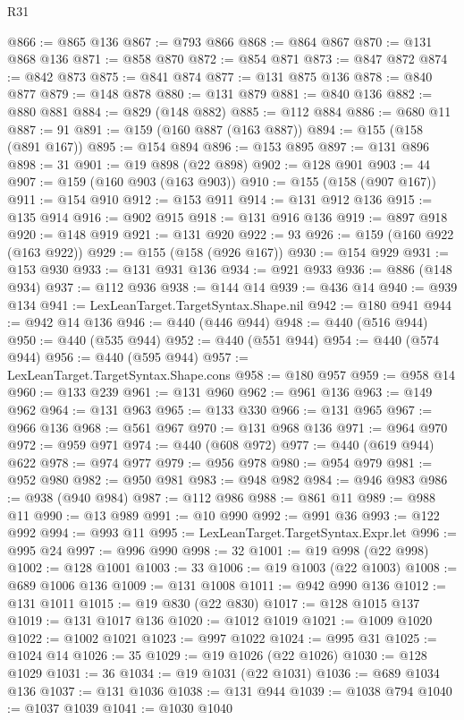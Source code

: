 \begin{lexlean}{R31}
\begin{coremodule}
@866 := @865 @136
@867 := @793 @866
@868 := @864 @867
@870 := @131 @868 @136
@871 := @858 @870
@872 := @854 @871
@873 := @847 @872
@874 := @842 @873
@875 := @841 @874
@877 := @131 @875 @136
@878 := @840 @877
@879 := @148 @878
@880 := @131 @879
@881 := @840 @136
@882 := @880 @881
@884 := @829 (@148 @882)
@885 := @112 @884
@886 := @680 @11
@887 := 91
@891 := @159 (@160 @887 (@163 @887))
@894 := @155 (@158 (@891 @167))
@895 := @154 @894
@896 := @153 @895
@897 := @131 @896
@898 := 31
@901 := @19 @898 (@22 @898)
@902 := @128 @901
@903 := 44
@907 := @159 (@160 @903 (@163 @903))
@910 := @155 (@158 (@907 @167))
@911 := @154 @910
@912 := @153 @911
@914 := @131 @912 @136
@915 := @135 @914
@916 := @902 @915
@918 := @131 @916 @136
@919 := @897 @918
@920 := @148 @919
@921 := @131 @920
@922 := 93
@926 := @159 (@160 @922 (@163 @922))
@929 := @155 (@158 (@926 @167))
@930 := @154 @929
@931 := @153 @930
@933 := @131 @931 @136
@934 := @921 @933
@936 := @886 (@148 @934)
@937 := @112 @936
@938 := @144 @14
@939 := @436 @14
@940 := @939 @134
@941 := LexLeanTarget.TargetSyntax.Shape.nil
@942 := @180 @941
@944 := @942 @14 @136
@946 := @440 (@446 @944)
@948 := @440 (@516 @944)
@950 := @440 (@535 @944)
@952 := @440 (@551 @944)
@954 := @440 (@574 @944)
@956 := @440 (@595 @944)
@957 := LexLeanTarget.TargetSyntax.Shape.cons
@958 := @180 @957
@959 := @958 @14
@960 := @133 @239
@961 := @131 @960
@962 := @961 @136
@963 := @149 @962
@964 := @131 @963
@965 := @133 @330
@966 := @131 @965
@967 := @966 @136
@968 := @561 @967
@970 := @131 @968 @136
@971 := @964 @970
@972 := @959 @971
@974 := @440 (@608 @972)
@977 := @440 (@619 @944) @622
@978 := @974 @977
@979 := @956 @978
@980 := @954 @979
@981 := @952 @980
@982 := @950 @981
@983 := @948 @982
@984 := @946 @983
@986 := @938 (@940 @984)
@987 := @112 @986
@988 := @861 @11
@989 := @988 @11
@990 := @13 @989
@991 := @10 @990
@992 := @991 @36
@993 := @122 @992
@994 := @993 @11
@995 := LexLeanTarget.TargetSyntax.Expr.let
@996 := @995 @24
@997 := @996 @990
@998 := 32
@1001 := @19 @998 (@22 @998)
@1002 := @128 @1001
@1003 := 33
@1006 := @19 @1003 (@22 @1003)
@1008 := @689 @1006 @136
@1009 := @131 @1008
@1011 := @942 @990 @136
@1012 := @131 @1011
@1015 := @19 @830 (@22 @830)
@1017 := @128 @1015 @137
@1019 := @131 @1017 @136
@1020 := @1012 @1019
@1021 := @1009 @1020
@1022 := @1002 @1021
@1023 := @997 @1022
@1024 := @995 @31
@1025 := @1024 @14
@1026 := 35
@1029 := @19 @1026 (@22 @1026)
@1030 := @128 @1029
@1031 := 36
@1034 := @19 @1031 (@22 @1031)
@1036 := @689 @1034 @136
@1037 := @131 @1036
@1038 := @131 @944
@1039 := @1038 @794
@1040 := @1037 @1039
@1041 := @1030 @1040

\end{coremodule}
\end{lexlean}
